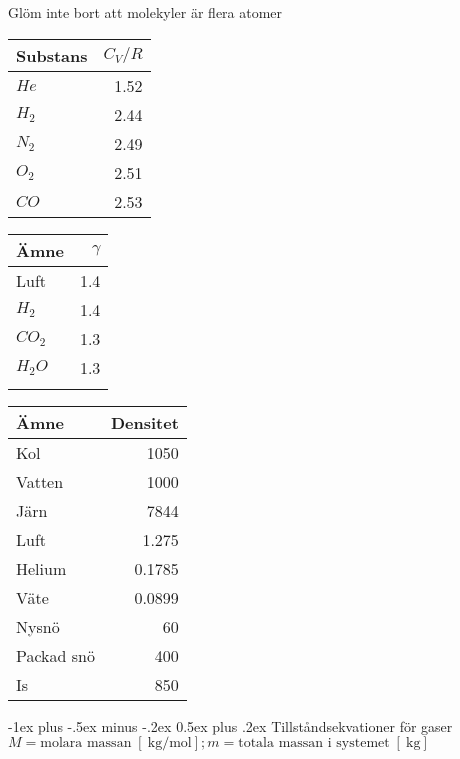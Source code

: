 \documentclass[10pt,landscape]{article}
\makeatletter
\newcommand{\unit}[1]{
\;[\SI{}{#1}]
}
\renewcommand{\section}{\@startsection{section}{1}{0mm}%
                                {-1ex plus -.5ex minus -.2ex}%
                                {0.5ex plus .2ex}%
                                {\normalfont\large\bfseries}
                                }
\makeatother
\begin{document}
\begin{multicols}{3}
{Glöm inte bort att molekyler är flera atomer
}
\parbox{.32\linewidth}{
\begin{tabular}{l r }
Substans & $C_V / R$\\
\hline
$He$ & 1.52\\
$H_2$ & 2.44\\
$N_2$ & 2.49\\
$O_2$ & 2.51\\
$CO$ & 2.53\\
\end{tabular}
}
\parbox{.32\linewidth}{
\begin{tabular}{l r }
Ämne & $\gamma$\\
\hline
Luft & 1.4\\
$H_2$ & 1.4\\
$CO_2$ & 1.3\\
$H_2O$ & 1.3\\
&\\
\end{tabular}
}

\parbox{.40\linewidth}{
\begin{tabular}{l r}
Ämne & Densitet \unit{\kilogram\per\meter\cubed}\\
\hline
Kol & 1050\\
Vatten & 1000\\
Järn & 7844\\
Luft & 1.275\\
Helium & 0.1785\\
Väte & 0.0899\\
Nysnö & 60\\
Packad snö & 400\\
Is & 850\\
\end{tabular}
}


\section{Tillståndsekvationer för gaser}
$M = \text{molara massan} \unit{\kilogram\per\mol}; m = \text{totala massan i systemet} \unit{\kilogram}$


\end{multicols}
\end{document}
